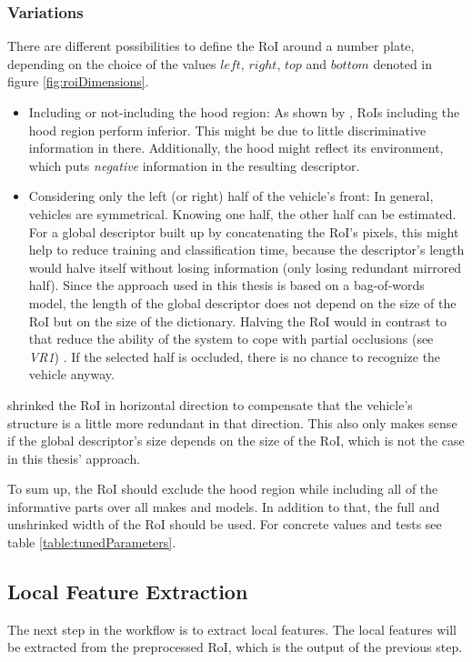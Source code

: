 \subsubsection{Variations}
There are different possibilities to define the RoI around a number plate, depending on the choice of the values $left$, $right$, $top$ and $bottom$ denoted in figure \ref{fig:roiDimensions}.

\begin{itemize}
  \item Including or not-including the hood region: As shown by \citep{hsieh2014symmetrical}, RoIs including the hood region perform inferior. This might be due to little discriminative information in there. Additionally, the hood might reflect its environment, which puts \emph{negative} information in the resulting descriptor.
  \item Considering only the left (or right) half of the vehicle's front: In general, vehicles are symmetrical. Knowing one half, the other half can be estimated. For a global descriptor built up by concatenating the RoI's pixels, this might help to reduce training and classification time, because the descriptor's length would halve itself without losing information (only losing redundant mirrored half). Since the approach used in this thesis is based on a bag-of-words model, the length of the global descriptor does not depend on the size of the RoI but on the size of the dictionary. Halving the RoI would in contrast to that reduce the ability of the system to cope with partial occlusions (see \emph{VR1}) \citep{siddiqui2015robust}. If the selected half is occluded, there is no chance to recognize the vehicle anyway.
\end{itemize}
\citeauthor{petrovic2004analysis} \citep{petrovic2004analysis} shrinked the RoI in horizontal direction to compensate that the vehicle's structure is a little more redundant in that direction. This also only makes sense if the global descriptor's size depends on the size of the RoI, which is not the case in this thesis' approach.

To sum up, the RoI should exclude the hood region while including all of the informative parts over all makes and models. In addition to that, the full and unshrinked width of the RoI should be used. For concrete values and tests see table \ref{table:tunedParameters}.

\subsection{Local Feature Extraction}\label{sec:localFeatureExtractionConcept}
The next step in the workflow is to extract local features. The local features will be extracted from the preprocessed RoI, which is the output of the previous step.


